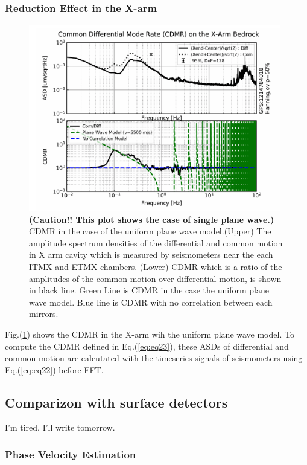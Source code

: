 \documentclass[a4paper,12pt]{book}
\begin{document}
\subsubsection{Reduction Effect in the X-arm}

\begin{figure}[H]
  \begin{center}
    \includegraphics[width=11.0cm]{./img_cdmr_xarm.png}
  \end{center}
  \caption{\textbf{(Caution!! This plot shows the case of single plane wave.)} CDMR in the case of the uniform plane wave model.(Upper) The amplitude spectrum densities of the differential and common motion in X arm cavity which is measured by seismometers near the each ITMX and ETMX chambers. (Lower) CDMR which is a ratio of the amplitudes of the common motion over differential motion, is shown in black line. Green Line is CDMR in the case the uniform plane wave model. Blue line is CDMR with no correlation between each mirrors.}\label{img:img_cdmr_xarm}
\end{figure}

Fig.(\ref{img:img_cdmr_xarm}) shows the CDMR in the X-arm wih the uniform plane wave model. To compute the CDMR defined in Eq.(\ref{eq:eq23}), these ASDs of differential and common motion are calcutated with the timeseries signals of seismometers using Eq.(\ref{eq:eq22}) before FFT. 





\subsection{Comparizon with surface detectors}
I'm tired. I'll write tomorrow.

\subsubsection{Phase Velocity Estimation}
\end{document}
